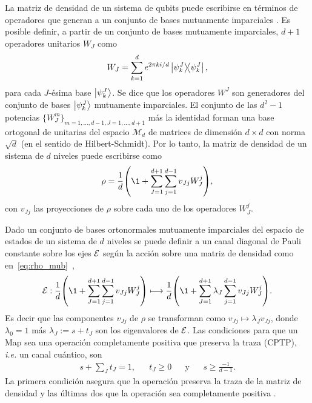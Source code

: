 La matriz de densidad de un sistema de qubits puede escribirse en términos 
de operadores que generan a un conjunto de bases mutuamente imparciales
.
Es posible definir, a partir de un conjunto de bases mutuamente imparciales,
$d+1$ operadores unitarios $W_J$ como~\cite{nathanson2007pauli}
\begin{align}\label{eq:W_J}
	W_J=\sum_{k=1}^d e^{2\pi k i/d} \dyad{\psi_k^J}{\psi_k^J}, 
\end{align}
para cada $J$-ésima base $\ket{\psi_k^J}$. Se dice que los operadores 
$W^J$ son generadores del conjunto de bases $\ket{\psi_k^J}$ mutuamente 
imparciales. El conjunto de las $d^2-1$ potencias $\{W_J^m\}_{m=1,\ldots,d-1,
J=1,\ldots,d+1}$ más la identidad forman una base ortogonal
de unitarias del espacio $\mathcal{M}_d$ de matrices 
de dimensión $d\times d$ con norma $\sqrt{d}$
(en el sentido de Hilbert-Schmidt). Por lo tanto, la matriz de densidad
de un sistema de $d$ niveles puede escribirse como
\begin{align}\label{eq:rho_mub}
\rho=\frac{1}{d}\qty(\1+\sum_{J=1}^{d+1}\sum_{j=1}^{d-1} v_{Jj}W_J^j),
\end{align}
con $v_{Jj}$ las proyecciones de $\rho$ sobre cada uno de los 
operadores $W_J^j$.

Dado un conjunto de bases ortonormales mutuamente imparciales del 
espacio de estados de un sistema de $d$ niveles se
puede definir a un canal diagonal de Pauli constante sobre los ejes $\mathcal{E}$ 
según la acción sobre una matriz de densidad como 
en~\eqref{eq:rho_mub}~\cite{nathanson2007pauli},
\begin{align}\label{eq:ruskai_definition}
	\E :  \frac{1}{d}\qty(\1+\sum_{J=1}^{d+1}\sum_{j=1}^{d-1} v_{Jj}W_J^j)
	\longmapsto 
	\frac{1}{d}\qty(\1+\sum_{J=1}^{d+1}\lambda_J\sum_{j=1}^{d-1} v_{Jj}W_J^j).
\end{align}
Es decir que las componentes $v_{Jj}$ de $\rho$ se transforman como 
$v_{Jj}\mapsto\lambda_Jv_{Jj}$, donde $\lambda_0=1$ más $\lambda_J:=s+t_J$ son
los eigenvalores de $\mathcal{E}$. Las 
condiciones para que un \ruskai{}{}{}Map{} sea una operación 
completamente positiva que preserva la traza (CPTP), \textit{i.e.} un canal cuántico,
son
\begin{align}\label{eq:cptp_conditions_ruskai}
	s+\sum_{J}t_J=1, && t_J\geq0 && \text{y} && s\geq\frac{-1}{d-1}.
\end{align}
La primera condición asegura que la operación preserva la traza de la matriz 
de densidad y las últimas dos que la operación sea completamente positiva
\cite{nathanson2007pauli}.

